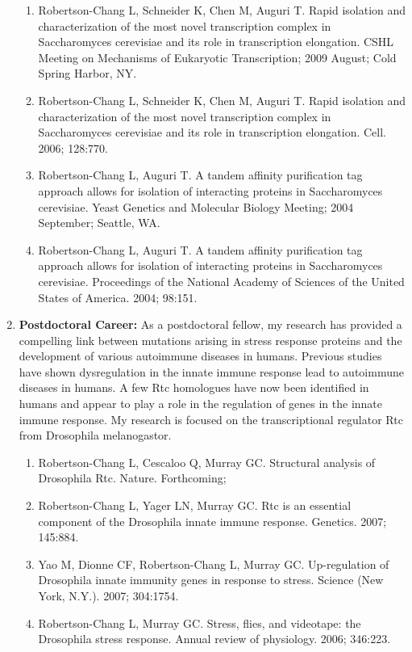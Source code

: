 \documentclass{nihbiosketch}
\begin{document}
\begin{enumerate}
\begin{enumerate}
\item
Robertson-Chang L, Schneider K, Chen M, Auguri T. Rapid isolation and characterization of the most novel transcription complex in Saccharomyces cerevisiae and its role in transcription elongation. CSHL Meeting on Mechanisms of Eukaryotic Transcription; 2009 August; Cold Spring Harbor, NY.
\item
Robertson-Chang L, Schneider K, Chen M, Auguri T. Rapid isolation and characterization of the most novel transcription complex in Saccharomyces cerevisiae and its role in transcription elongation. Cell. 2006; 128:770. 
\item
Robertson-Chang L, Auguri T. A tandem affinity purification tag approach allows for isolation of interacting proteins in Saccharomyces cerevisiae. Yeast Genetics and Molecular Biology Meeting; 2004 September; Seattle, WA. 
\item
Robertson-Chang L, Auguri T. A tandem affinity purification tag approach allows for isolation of interacting proteins in Saccharomyces cerevisiae. Proceedings of the National Academy of Sciences of the United States of America. 2004; 98:151.
\end{enumerate}

\item
{\bfseries Postdoctoral Career:}
As a postdoctoral fellow, my research has provided a compelling link between mutations arising in stress response proteins and the development of various autoimmune diseases in humans. Previous studies have shown dysregulation in the innate immune response lead to autoimmune diseases in humans. A few Rtc homologues have now been identified in humans and appear to play a role in the regulation of genes in the innate immune response. My research is focused on the transcriptional regulator Rtc from Drosophila melanogastor.

\begin{enumerate}
\item
Robertson-Chang L, Cescaloo Q, Murray GC. Structural analysis of Drosophila Rtc. Nature. Forthcoming; 
\item
Robertson-Chang L, Yager LN, Murray GC. Rtc is an essential component of the Drosophila innate immune response. Genetics. 2007; 145:884.
\item
Yao M, Dionne CF, Robertson-Chang L, Murray GC. Up-regulation of Drosophila innate immunity genes in response to stress. Science (New York, N.Y.). 2007; 304:1754.
\item
Robertson-Chang L, Murray GC. Stress, flies, and videotape: the Drosophila stress response. Annual review of physiology. 2006; 346:223.
\end{enumerate}

\end{enumerate}
\end{document}
